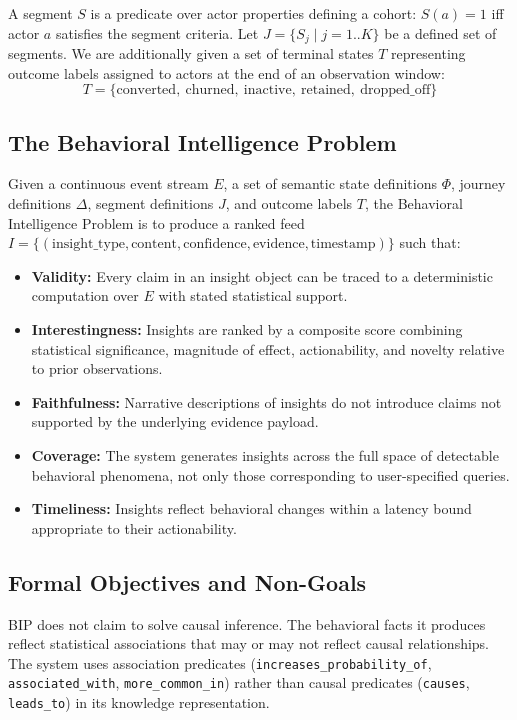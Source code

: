 \documentclass[12pt, a4paper]{article}
\begin{document}
A segment $S$ is a predicate over actor properties defining a cohort: $S(a) = 1$ iff actor $a$ satisfies the segment criteria. Let $J = \{S_j \mid j = 1..K\}$ be a defined set of segments. We are additionally given a set of terminal states $T$ representing outcome labels assigned to actors at the end of an observation window:
\[
T = \{\text{converted},\ \text{churned},\ \text{inactive},\ \text{retained},\ \text{dropped\_off}\}
\]

\subsection{The Behavioral Intelligence Problem}

Given a continuous event stream $E$, a set of semantic state definitions $\Phi$, journey definitions $\Delta$, segment definitions $J$, and outcome labels $T$, the Behavioral Intelligence Problem is to produce a ranked feed $I = \{(\text{insight\_type}, \text{content}, \text{confidence}, \text{evidence}, \text{timestamp})\}$ such that:

\begin{itemize}[leftmargin=1.5em]
  \item \textbf{Validity:} Every claim in an insight object can be traced to a deterministic computation over $E$ with stated statistical support.
  \item \textbf{Interestingness:} Insights are ranked by a composite score combining statistical significance, magnitude of effect, actionability, and novelty relative to prior observations.
  \item \textbf{Faithfulness:} Narrative descriptions of insights do not introduce claims not supported by the underlying evidence payload.
  \item \textbf{Coverage:} The system generates insights across the full space of detectable behavioral phenomena, not only those corresponding to user-specified queries.
  \item \textbf{Timeliness:} Insights reflect behavioral changes within a latency bound appropriate to their actionability.
\end{itemize}

\subsection{Formal Objectives and Non-Goals}

BIP does not claim to solve causal inference. The behavioral facts it produces reflect statistical associations that may or may not reflect causal relationships. The system uses association predicates (\texttt{increases\_probability\_of}, \texttt{associated\_with}, \texttt{more\_common\_in}) rather than causal predicates (\texttt{causes}, \texttt{leads\_to}) in its knowledge representation.
\end{document}
